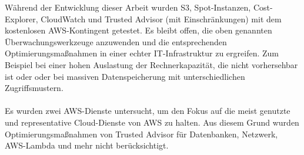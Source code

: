 Während der Entwicklung dieser Arbeit wurden S3, Spot-Instanzen, Cost-Explorer, CloudWatch und Trusted Advisor (mit Einschränkungen) mit dem kostenlosen AWS-Kontingent getestet. 
Es bleibt offen, die oben genannten Überwachungswerkzeuge anzuwenden und die entsprechenden Optimierungsmaßnahmen in einer echter IT-Infrastruktur zu ergreifen. 
Zum Beispiel bei einer hohen Auslastung der Rechnerkapazität, die nicht vorhersehbar ist oder %
oder bei massiven Datenspeicherung mit unterschiedlichen Zugriffsmustern.%
\\\\
Es wurden zwei AWS-Dienste untersucht, um den Fokus auf die meist genutzte und representative Cloud-Dienste von AWS zu halten. Aus diesem Grund wurden Optimierungsmaßnahmen von Trusted Advisor für Datenbanken, Netzwerk, AWS-Lambda und mehr nicht berücksichtigt.
